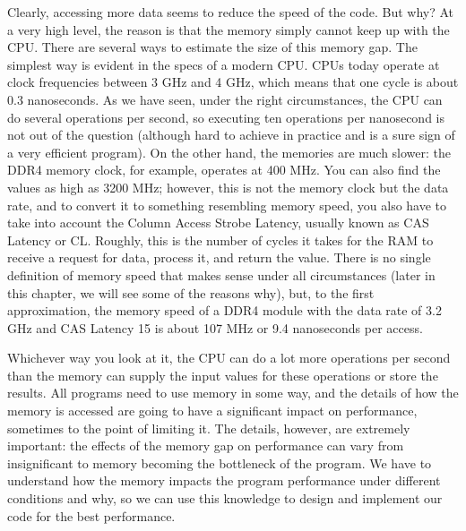 Clearly, accessing more data seems to reduce the speed of the code. But why? At a very high level, the reason is that the memory simply cannot keep up with the CPU. There are several ways to estimate the size of this memory gap. The simplest way is evident in the specs of a modern CPU. CPUs today operate at clock frequencies between 3 GHz and 4 GHz, which means that one cycle is about 0.3 nanoseconds. As we have seen, under the right circumstances, the CPU can do several operations per second, so executing ten operations per nanosecond is not out of the question (although hard to achieve in practice and is a sure sign of a very efficient program). On the other hand, the memories are much slower: the DDR4 memory clock, for example, operates at 400 MHz. You can also find the values as high as 3200 MHz; however, this is not the memory clock but the data rate, and to convert it to something resembling memory speed, you also have to take into account the Column Access Strobe Latency, usually known as CAS Latency or CL. Roughly, this is the number of cycles it takes for the RAM to receive a request for data, process it, and return the value. There is no single definition of memory speed that makes sense under all circumstances (later in this chapter, we will see some of the reasons why), but, to the first approximation, the memory speed of a DDR4 module with the data rate of 3.2 GHz and CAS Latency 15 is about 107 MHz or 9.4 nanoseconds per access.

Whichever way you look at it, the CPU can do a lot more operations per second than the memory can supply the input values for these operations or store the results. All programs need to use memory in some way, and the details of how the memory is accessed are going to have a significant impact on performance, sometimes to the point of limiting it. The details, however, are extremely important: the effects of the memory gap on performance can vary from insignificant to memory becoming the bottleneck of the program. We have to understand how the memory impacts the program performance under different conditions and why, so we can use this knowledge to design and implement our code for the best performance.








